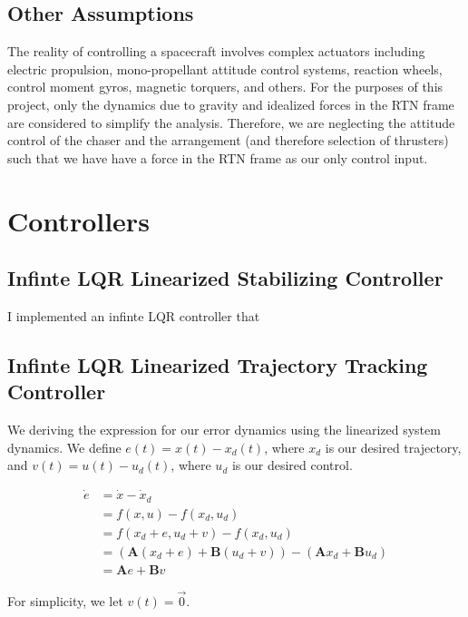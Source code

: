 \documentclass[12pt, letterpaper,titlepage]{article}
\def\bf{\mathbf}
\begin{document}
\subsection{Other Assumptions}

The reality of controlling a spacecraft involves complex actuators including
electric propulsion, mono-propellant attitude control systems, reaction wheels,
control moment gyros, magnetic torquers, and others. For the purposes of this
project, only the dynamics due to gravity and idealized forces in the RTN frame
are considered to simplify the analysis. Therefore, we are neglecting the
attitude control of the chaser and the arrangement (and therefore selection of
thrusters) such that we have have a force in the RTN frame as our only control
input.

\section{Controllers}

\subsection{Infinte LQR Linearized Stabilizing Controller}

I implemented an infinte LQR controller that 

\subsection{Infinte LQR Linearized Trajectory Tracking Controller}

We deriving the expression for our error dynamics using the linearized system
dynamics. We define $e(t) = x(t) - x_d(t)$, where $x_d$ is our desired
trajectory, and $v(t) = u(t) - u_d(t)$, where $u_d$ is our desired control.

\begin{equation}
    \label{linearized_error_dynamics}
    \begin{split}
        \dot{e} & = \dot{x} - \dot{x}_d \\
                & = f(x, u) - f(x_d, u_d) \\
                & = f(x_d + e, u_d + v) - f(x_d, u_d) \\
                & = (\bf{A}(x_d + e) + \bf{B}(u_d + v)) - (\bf{A}x_d +
                    \bf{B}u_d) \\
                & = \bf{A}e + \bf{B}v
    \end{split}
\end{equation}

For simplicity, we let $v(t) = \vec{0}.$



\end{document}
